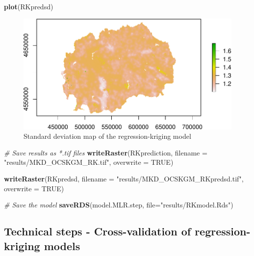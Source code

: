 \documentclass[10pt,b5paper,]{book}
\newenvironment{Shaded}{\begin{snugshade}}{\end{snugshade}}
\newcommand{\CommentTok}[1]{\textcolor[rgb]{0.56,0.35,0.01}{\textit{#1}}}
\newcommand{\DataTypeTok}[1]{\textcolor[rgb]{0.13,0.29,0.53}{#1}}
\newcommand{\KeywordTok}[1]{\textcolor[rgb]{0.13,0.29,0.53}{\textbf{#1}}}
\newcommand{\NormalTok}[1]{#1}
\newcommand{\OtherTok}[1]{\textcolor[rgb]{0.56,0.35,0.01}{#1}}
\newcommand{\StringTok}[1]{\textcolor[rgb]{0.31,0.60,0.02}{#1}}
\theoremstyle{definition}
\theoremstyle{definition}
\theoremstyle{definition}
\theoremstyle{remark}
\begin{document}
\begin{Shaded}
\begin{Highlighting}[]
\KeywordTok{plot}\NormalTok{(RKpredsd)}
\end{Highlighting}
\end{Shaded}

\begin{figure}
\centering
\includegraphics{SOCMapping_files/figure-latex/predSDRK-1.pdf}
\caption{\label{fig:predSDRK}Standard deviation map of the
regression-kriging model}
\end{figure}

\begin{Shaded}
\begin{Highlighting}[]
\CommentTok{# Save results as *.tif files}
\KeywordTok{writeRaster}\NormalTok{(RKprediction, }\DataTypeTok{filename =} \StringTok{"results/MKD_OCSKGM_RK.tif"}\NormalTok{,}
            \DataTypeTok{overwrite =} \OtherTok{TRUE}\NormalTok{)}

\KeywordTok{writeRaster}\NormalTok{(RKpredsd, }\DataTypeTok{filename =} \StringTok{"results/MKD_OCSKGM_RKpredsd.tif"}\NormalTok{,}
            \DataTypeTok{overwrite =} \OtherTok{TRUE}\NormalTok{)}
\end{Highlighting}
\end{Shaded}

\begin{Shaded}
\begin{Highlighting}[]
\CommentTok{# Save the model}
\KeywordTok{saveRDS}\NormalTok{(model.MLR.step, }\DataTypeTok{file=}\StringTok{"results/RKmodel.Rds"}\NormalTok{)}
\end{Highlighting}
\end{Shaded}

\hypertarget{technical-steps---cross-validation-of-regression-kriging-models}{%
\subsection{Technical steps - Cross-validation of regression-kriging
models}\label{technical-steps---cross-validation-of-regression-kriging-models}}
\end{document}
